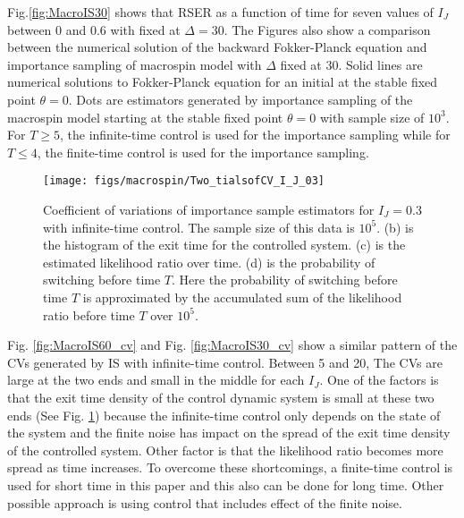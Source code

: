 \documentclass[journal,transmag]{IEEEtran}
\begin{document}
Fig.\ref{fig:MacroIS30} shows that RSER as a function of time for seven values of $I_J$ between $0$ and $ 0.6$ with fixed at $\Delta = 30$.  The Figures also show a comparison between the numerical solution of the backward Fokker-Planck equation and importance sampling of macrospin model with $\Delta$ fixed at $30$. 
Solid lines are numerical solutions to Fokker-Planck equation for an initial at the stable fixed point $\theta = 0$. Dots are estimators generated by importance sampling of the macrospin model starting at the stable fixed point $\theta = 0$ with sample size of $10^3$. For $T \ge 5$, the infinite-time control is used for the importance sampling while for $T \le 4$, the finite-time control is used for the importance sampling.
\begin{figure}[h]
   \centering
         \texttt{[image: figs/macrospin/Two\_tialsofCV\_I\_J\_03]}
   \caption{Coefficient of variations of importance sample estimators for $I_J = 0.3$ with infinite-time control. The sample size of this data is $10^5$. (b) is the histogram of the exit time for the controlled system. (c) is the estimated likelihood ratio over time. (d) is the probability of switching before time $T$. Here the probability of switching before time $T$ is approximated by the accumulated sum of the likelihood ratio before time $T$ over $10^5$.}
   \label{fig:Two_tialsofCV_I_J_03}
\end{figure}

Fig. \ref{fig:MacroIS60_cv} and  Fig. \ref{fig:MacroIS30_cv} show a similar pattern of the CVs generated by IS with infinite-time control. Between 5 and 20, The CVs are large at the two ends and small in the middle for each $I_J$. One of the factors is that the exit time density of the control dynamic system is small at these two ends (See Fig. \ref{fig:Two_tialsofCV_I_J_03}) because the infinite-time control only depends on the state of the system and the finite noise has impact on the spread of the exit time density of the controlled system. Other factor is that the likelihood ratio becomes more spread as time increases.  To overcome these shortcomings, a finite-time control is used for short time in this paper and this also can be done for long time. Other possible approach is using control that includes effect of the finite noise.    
\end{document}
